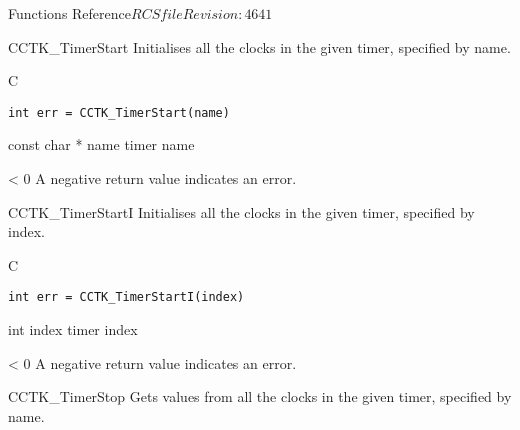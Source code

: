\begin{cactuspart}{ Functions Reference}{$RCSfile$}{$Revision: 4641 $}
\begin{FunctionDescription}{CCTK\_TimerStart}
\label{CCTK-TimerStart}
Initialises all the clocks in the
given timer, specified by name.
\begin{SynopsisSection}
\begin{Synopsis}{C}
\begin{verbatim}
int err = CCTK_TimerStart(name)
\end{verbatim}
\end{Synopsis}
\end{SynopsisSection}

\begin{ParameterSection}
\begin{Parameter} {const char * name}
timer name
\end{Parameter}
\end{ParameterSection}

\begin{ErrorSection}
\begin{Error}{< 0}
A negative return value indicates an error.
\end{Error}
\end{ErrorSection}
\end{FunctionDescription}


\begin{FunctionDescription}{CCTK\_TimerStartI}
\label{CCTK-TimerStartI}
Initialises all the clocks in the
given timer, specified by index.
\begin{SynopsisSection}
\begin{Synopsis}{C}
\begin{verbatim}
int err = CCTK_TimerStartI(index)
\end{verbatim}
\end{Synopsis}
\end{SynopsisSection}

\begin{ParameterSection}
\begin{Parameter} {int index}
timer index
\end{Parameter}
\end{ParameterSection}

\begin{ErrorSection}
\begin{Error}{< 0}
A negative return value indicates an error.
\end{Error}
\end{ErrorSection}
\end{FunctionDescription}

\begin{FunctionDescription}{CCTK\_TimerStop}
\label{CCTK-TimerStop}
Gets values from all the clocks in the
given timer, specified by name.


\end{FunctionDescription}
\end{cactuspart}
